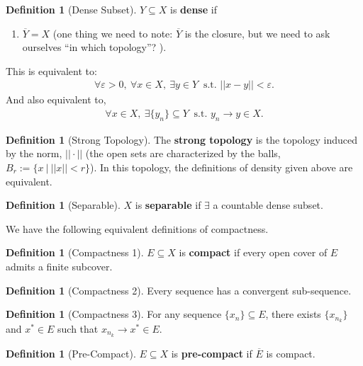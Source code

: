 \documentclass[psamsfonts]{amsart}
\theoremstyle{definition}
\newtheorem{defn}[thm]{Definition}
\theoremstyle{remark}
\newcommand{\eps}[0]{\varepsilon}
\numberwithin{equation}{section}
\begin{document}
\begin{defn}[Dense Subset]
	\( Y \subseteq X \) is \textbf{dense} if 
	\begin{enumerate}
		\item \( \overline{Y} = X \) (one thing we need to note: \( \overline{Y} \) is the closure, but we need to ask ourselves ``in which topology''? ).
	\end{enumerate}
	This is equivalent to: 
	\begin{align*}
		\forall \eps > 0,\ \forall x \in X,\ \exists y \in Y\ \text{ s.t. } || x - y || < \eps.
	\end{align*}
	And also equivalent to, 
	\begin{align*}
		\forall x \in X,\ \exists \{ y_n \} \subseteq Y\ \text{ s.t. } y_n \rightarrow y \in X. 
	\end{align*}
\end{defn}

\begin{defn}[Strong Topology]
	The \textbf{strong topology} is the topology induced by the norm, \( || \cdot || \) (the open sets are characterized by the balls, \( B_r := \{ x\ |\ || x || < r \} \)). In this topology, the definitions of density given above are equivalent.
\end{defn}

\begin{defn}[Separable]
	\( X \) is \textbf{separable} if \( \exists \) a countable dense subset. 
\end{defn}

We have the following equivalent definitions of compactness. 

\begin{defn}[Compactness 1]
	\( E \subseteq X \) is \textbf{compact} if every open cover of \( E \) admits a finite subcover.
\end{defn}

\begin{defn}[Compactness 2]
	Every sequence has a convergent sub-sequence. 
\end{defn}

\begin{defn}[Compactness 3]
	For any sequence  \( \{ x_n \} \subseteq E \), there exists \( \{ x_{n_k} \} \) and \( x^* \in E \) such that \( x_{n_k} \rightarrow x^* \in E \).
\end{defn}

\begin{defn}[Pre-Compact]
	\( E \subseteq X \) is \textbf{pre-compact} if \( \overline{E} \) is compact.
\end{defn}
\end{document}

